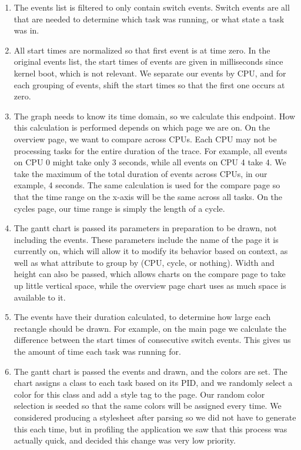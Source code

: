 \documentclass{hmcclinic}
\begin{document}
  \begin{enumerate}

    \item The events list is filtered to only contain switch events. Switch
      events are all that are needed to determine which task was running, or
      what state a task was in.
  
    \item All start times are normalized so that first event is at time zero.
      In the original events list, the start times of events are given in
      milliseconds since kernel boot, which is not relevant. We separate our
      events by CPU, and for each grouping of events, shift the start times
      so that the first one occurs at zero.
  
    \item The graph needs to know its time domain, so we calculate this
      endpoint. How this calculation is performed depends on which page we are
      on. On the overview page, we want to compare across CPUs. Each CPU may not
      be processing tasks for the entire duration of the trace. For example, all
      events on CPU 0 might take only 3 seconds, while all events on CPU 4 take
      4. We take the maximum of the total duration of events across CPUs, in our
      example, 4 seconds. The same calculation is used for the compare page so
      that the time range on the x-axis will be the same across all tasks.  On
      the cycles page, our time range is simply the length of a cycle.
  
    \item The gantt chart is passed its parameters in preparation to be drawn,
      not including the events. These parameters include the name of the page it
      is currently on, which will allow it to modify its behavior based on
      context, as well as what attribute to group by (CPU, cycle, or nothing).
      Width and height can also be passed, which allows charts on the compare
      page to take up little vertical space, while the overview page chart uses
      as much space is available to it.
  
   \item The events have their duration calculated, to determine how large each
     rectangle should be drawn. For example, on the main page we calculate the
     difference between the start times of consecutive switch events. This gives
     us the amount of time each task was running for.
  
   \item The gantt chart is passed the events and drawn, and the colors are set.
     The chart assigns a class to each task based on its PID, and we randomly
     select a color for this class and add a style tag to the page. Our random
     color selection is seeded so that the same colors will be assigned every
     time. We considered producing a stylesheet after parsing so we did not have
     to generate this each time, but in profiling the application we saw that
     this process was actually quick, and decided this change was very low
     priority.

  \end{enumerate}
\end{document}
